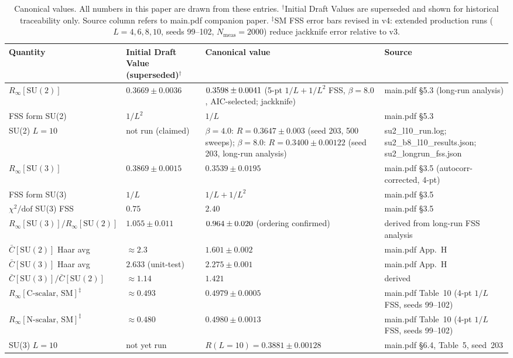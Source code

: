\begin{table}[htbp]
\caption{Canonical values. All numbers in this paper are drawn from
  these entries. $^{\dag}$Initial Draft Values are superseded and shown
  for historical traceability only. Source column refers to main.pdf companion paper.
  $^{\ddag}$SM FSS error bars revised in v4: extended production runs
  ($L{=}4,6,8,10$, seeds 99--102, $N_\text{meas}{=}2000$) reduce jackknife
  error relative to v3.}
\label{tab:canonical}
\begin{tabular}{llll}
Quantity & Initial Draft Value (superseded)$^{\dag}$ & Canonical value & Source \\
\hline
$R_\infty[\mathrm{SU}(2)]$
  & $0.3669\pm0.0036$
  & $0.3598 \pm 0.0041$ (5-pt $1/L+1/L^2$ FSS, $\beta{=}8.0$, AIC-selected; jackknife)
  & main.pdf \S5.3 (long-run analysis) \\
FSS form SU(2)
  & $1/L^2$
  & $1/L$
  & main.pdf \S5.3 \\
SU(2) $L=10$
  & not run (claimed)
  & $\beta{=}4.0$: $R=0.3647\pm0.003$ (seed 203, 500 sweeps);
    $\beta{=}8.0$: $R=0.3400\pm0.00122$ (seed 203, long-run analysis)
  & su2\_l10\_run.log; su2\_b8\_l10\_results.json; su2\_longrun\_fss.json \\
$R_\infty[\mathrm{SU}(3)]$
  & $0.3869\pm0.0015$
  & $0.3539\pm0.0195$
  & main.pdf \S3.5 (autocorr-corrected, 4-pt) \\
FSS form SU(3)
  & $1/L$
  & $1/L + 1/L^2$
  & main.pdf \S3.5 \\
$\chi^2/\mathrm{dof}$ SU(3) FSS
  & $0.75$
  & $2.40$
  & main.pdf \S3.5 \\
$R_\infty[\mathrm{SU}(3)]/R_\infty[\mathrm{SU}(2)]$
  & $1.055\pm0.011$
  & $0.964 \pm 0.020$ (ordering confirmed)
  & derived from long-run FSS analysis \\
$\bar{C}[\mathrm{SU}(2)]$ Haar avg
  & $\approx 2.3$
  & $1.601\pm0.002$
  & main.pdf App.\ H \\
$\bar{C}[\mathrm{SU}(3)]$ Haar avg
  & $2.633$ (unit-test)
  & $2.275\pm0.001$
  & main.pdf App.\ H \\
$\bar{C}[\mathrm{SU}(3)]/\bar{C}[\mathrm{SU}(2)]$
  & $\approx 1.14$
  & $1.421$
  & derived \\
$R_\infty[\text{C-scalar, SM}]^{\ddag}$
  & $\approx 0.493$
  & $0.4979\pm0.0005$
  & main.pdf Table~10 (4-pt $1/L$ FSS, seeds 99--102) \\
$R_\infty[\text{N-scalar, SM}]^{\ddag}$
  & $\approx 0.480$
  & $0.4980\pm0.0013$
  & main.pdf Table~10 (4-pt $1/L$ FSS, seeds 99--102) \\
SU(3) $L=10$
  & not yet run
  & $R(L{=}10) = 0.3881\pm0.00128$
  & main.pdf \S6.4, Table~5, seed~203 \\
\end{tabular}
\end{table}

